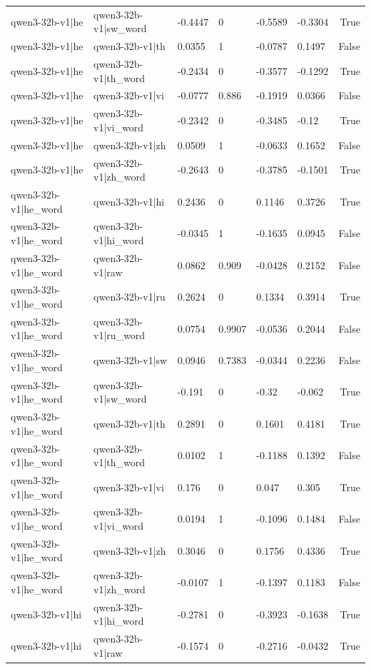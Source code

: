 \begin{table}
\begin{tabular}{llllllr}
qwen3-32b-v1|he & qwen3-32b-v1|sw_word & -0.4447 & 0 & -0.5589 & -0.3304 & True \\
qwen3-32b-v1|he & qwen3-32b-v1|th & 0.0355 & 1 & -0.0787 & 0.1497 & False \\
qwen3-32b-v1|he & qwen3-32b-v1|th_word & -0.2434 & 0 & -0.3577 & -0.1292 & True \\
qwen3-32b-v1|he & qwen3-32b-v1|vi & -0.0777 & 0.886 & -0.1919 & 0.0366 & False \\
qwen3-32b-v1|he & qwen3-32b-v1|vi_word & -0.2342 & 0 & -0.3485 & -0.12 & True \\
qwen3-32b-v1|he & qwen3-32b-v1|zh & 0.0509 & 1 & -0.0633 & 0.1652 & False \\
qwen3-32b-v1|he & qwen3-32b-v1|zh_word & -0.2643 & 0 & -0.3785 & -0.1501 & True \\
qwen3-32b-v1|he_word & qwen3-32b-v1|hi & 0.2436 & 0 & 0.1146 & 0.3726 & True \\
qwen3-32b-v1|he_word & qwen3-32b-v1|hi_word & -0.0345 & 1 & -0.1635 & 0.0945 & False \\
qwen3-32b-v1|he_word & qwen3-32b-v1|raw & 0.0862 & 0.909 & -0.0428 & 0.2152 & False \\
qwen3-32b-v1|he_word & qwen3-32b-v1|ru & 0.2624 & 0 & 0.1334 & 0.3914 & True \\
qwen3-32b-v1|he_word & qwen3-32b-v1|ru_word & 0.0754 & 0.9907 & -0.0536 & 0.2044 & False \\
qwen3-32b-v1|he_word & qwen3-32b-v1|sw & 0.0946 & 0.7383 & -0.0344 & 0.2236 & False \\
qwen3-32b-v1|he_word & qwen3-32b-v1|sw_word & -0.191 & 0 & -0.32 & -0.062 & True \\
qwen3-32b-v1|he_word & qwen3-32b-v1|th & 0.2891 & 0 & 0.1601 & 0.4181 & True \\
qwen3-32b-v1|he_word & qwen3-32b-v1|th_word & 0.0102 & 1 & -0.1188 & 0.1392 & False \\
qwen3-32b-v1|he_word & qwen3-32b-v1|vi & 0.176 & 0 & 0.047 & 0.305 & True \\
qwen3-32b-v1|he_word & qwen3-32b-v1|vi_word & 0.0194 & 1 & -0.1096 & 0.1484 & False \\
qwen3-32b-v1|he_word & qwen3-32b-v1|zh & 0.3046 & 0 & 0.1756 & 0.4336 & True \\
qwen3-32b-v1|he_word & qwen3-32b-v1|zh_word & -0.0107 & 1 & -0.1397 & 0.1183 & False \\
qwen3-32b-v1|hi & qwen3-32b-v1|hi_word & -0.2781 & 0 & -0.3923 & -0.1638 & True \\
qwen3-32b-v1|hi & qwen3-32b-v1|raw & -0.1574 & 0 & -0.2716 & -0.0432 & True \\

\end{tabular}
\end{table}
